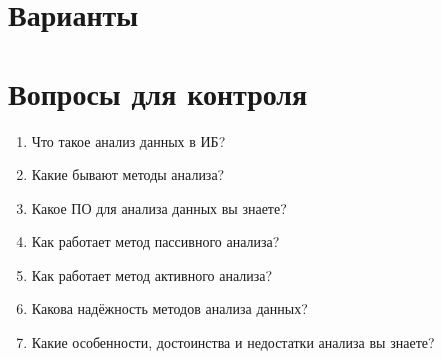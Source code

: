 \section{Варианты}\label{sect7_d}
%
\section{Вопросы для контроля}\label{sect7_e}
%
\begin{enumerate}
  \item Что такое анализ данных в ИБ?
  \item Какие бывают методы анализа?
  \item Какое ПО для анализа данных вы знаете?
  \item Как работает метод пассивного анализа?
  \item Как работает метод активного анализа?
  \item Какова надёжность методов анализа данных?
  \item Какие особенности, достоинства и недостатки анализа вы знаете?
\end{enumerate}
